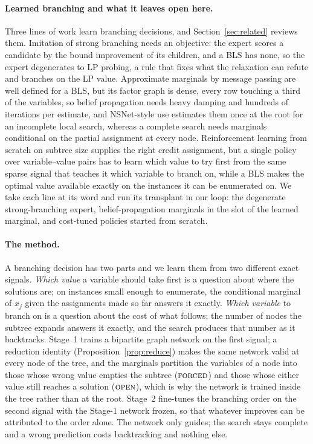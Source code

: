 \documentclass[final,5p,times,twocolumn,authoryear]{elsarticle}
\newcommand{\FORCED}{\textsc{forced}}
\newcommand{\FREE}{\textsc{open}}
\begin{document}
\paragraph{Learned branching and what it leaves open here.} Three lines of work learn branching decisions, and Section~\ref{sec:related} reviews them. Imitation of strong branching \citep{khalil2016learning,gasse2019exact} needs an objective: the expert scores a candidate by the bound improvement of its children, and a BLS has none, so the expert degenerates to LP probing, a rule that fixes what the relaxation can refute and branches on the LP value. Approximate marginals by message passing \citep{li2022nsnet} are well defined for a BLS, but its factor graph is dense, every row touching a third of the variables, so belief propagation needs heavy damping and hundreds of iterations per estimate, and NSNet-style use estimates them once at the root for an incomplete local search, whereas a complete search needs marginals conditional on the partial assignment at every node. Reinforcement learning from scratch on subtree size \citep{etheve2020reinforcement,scavuzzo2022learning} supplies the right credit assignment, but a single policy over variable--value pairs has to learn which value to try first from the same sparse signal that teaches it which variable to branch on, while a BLS makes the optimal value available exactly on the instances it can be enumerated on. We take each line at its word and run its transplant in our loop: the degenerate strong-branching expert, belief-propagation marginals in the slot of the learned marginal, and cost-tuned policies started from scratch.

\paragraph{The method.} A branching decision has two parts and we learn them from two different exact signals. \emph{Which value} a variable should take first is a question about where the solutions are; on instances small enough to enumerate, the conditional marginal of $x_j$ given the assignments made so far answers it exactly. \emph{Which variable} to branch on is a question about the cost of what follows; the number of nodes the subtree expands answers it exactly, and the search produces that number as it backtracks. Stage~1 trains a bipartite graph network on the first signal; a reduction identity (Proposition~\ref{prop:reduce}) makes the same network valid at every node of the tree, and the marginals partition the variables of a node into those whose wrong value empties the subtree ($\FORCED$) and those whose either value still reaches a solution ($\FREE$), which is why the network is trained inside the tree rather than at the root. Stage~2 fine-tunes the branching order on the second signal with the Stage-1 network frozen, so that whatever improves can be attributed to the order alone. The network only guides; the search stays complete and a wrong prediction costs backtracking and nothing else.
\end{document}
